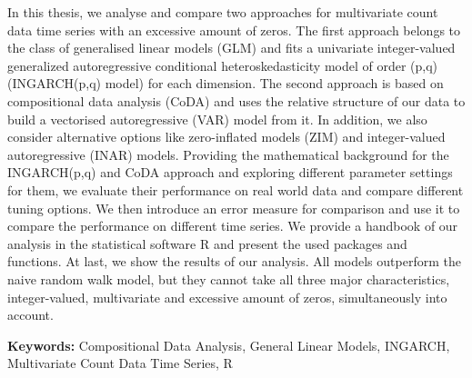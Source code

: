 In this thesis, we analyse and compare two approaches for multivariate count data time series with an excessive amount of zeros. The first approach belongs to the class of generalised linear models (GLM) and fits a univariate integer-valued generalized autoregressive conditional heteroskedasticity model of order (p,q) (INGARCH(p,q) model) for each dimension. The second approach is based on compositional data analysis (CoDA) and uses the relative structure of our data to build a vectorised autoregressive (VAR) model from it. In addition, we also consider alternative options like zero-inflated models (ZIM) and integer-valued autoregressive (INAR) models. Providing the mathematical background for the INGARCH(p,q) and CoDA approach and exploring different parameter settings for them, we evaluate their performance on real world data and compare different tuning options. We then introduce an error measure for comparison and use it to compare the performance on different time series. We provide a handbook of our analysis in the statistical software R and present the used packages and functions. At last, we show the results of our analysis. All models outperform the naive random walk model, but they cannot take all three major characteristics, integer-valued, multivariate and excessive amount of zeros, simultaneously into account.  \newline



\textbf{Keywords:} Compositional Data Analysis, General Linear Models, INGARCH, Multivariate Count Data Time Series, R